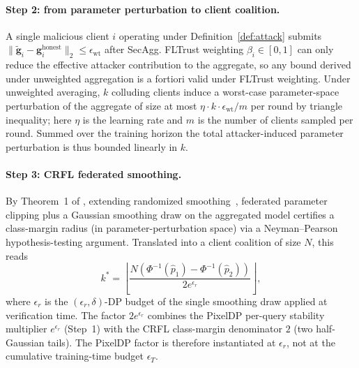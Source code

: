 \documentclass[11pt]{article}
\theoremstyle{plain}
\theoremstyle{definition}
\theoremstyle{remark}
\newcommand{\norm}[1]{\|#1\|}
\begin{document}
\paragraph{Step 2: from parameter perturbation to client coalition.}
A single malicious client $i$ operating under
Definition~\ref{def:attack} submits
$\norm{\tilde{\mathbf{g}}_i-\mathbf{g}_i^{\mathrm{honest}}}_2\le
\epsilon_{\mathrm{wt}}$ after SecAgg. FLTrust weighting
$\beta_i\in[0,1]$ can only reduce the effective attacker
contribution to the aggregate, so any bound derived under
unweighted aggregation is a fortiori valid under FLTrust
weighting. Under unweighted averaging, $k$ colluding clients induce
a worst-case parameter-space perturbation of the aggregate of size
at most $\eta\cdot k\cdot\epsilon_{\mathrm{wt}}/m$ per round by
triangle inequality; here $\eta$ is the learning rate and $m$ is
the number of clients sampled per round. Summed over the training
horizon the total attacker-induced parameter perturbation is thus
bounded linearly in $k$.

\paragraph{Step 3: CRFL federated smoothing.}
By Theorem~1 of \citet{xie2021crfl}, extending randomized
smoothing~\cite{cohen2019certified}, federated parameter clipping
plus a Gaussian smoothing draw on the aggregated model certifies
a class-margin radius (in parameter-perturbation space) via a
Neyman--Pearson hypothesis-testing argument. Translated into a
client coalition of size $N$, this reads
\begin{equation}
k^* = \left\lfloor \frac{N (\Phi^{-1}(\hat{p}_1) - \Phi^{-1}(\hat{p}_2))}{2 e^{\epsilon_r}} \right\rfloor,
\end{equation}
where $\epsilon_r$ is the $(\epsilon_r,\delta)$-DP budget of the
single smoothing draw applied at verification time. The factor
$2 e^{\epsilon_r}$ combines the PixelDP per-query stability
multiplier $e^{\epsilon_r}$ (Step~1) with the CRFL
class-margin denominator $2$ (two half-Gaussian tails). The
PixelDP factor is therefore instantiated at $\epsilon_r$, not at
the cumulative training-time budget $\epsilon_T$.
\end{document}
